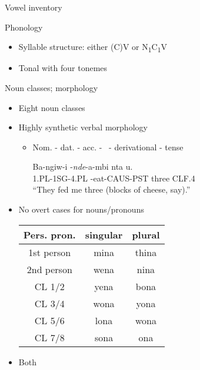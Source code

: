 \documentclass{beamer}
\let\ipa\textipa
\newcommand{\exsc}[1]{{\footnotesize\MakeUppercase{#1}}}
\begin{document}
\begin{frame}{Vowel inventory}
\begin{vowel}
\putcvowel{\ipa{E}\ \textlangle e\textrangle }{3}
\putcvowel{\ipa{O}\ \textlangle o\textrangle }{6}
\putcvowel{\ipa{7}}{7}
\end{vowel}
\end{frame}

\begin{frame}{Phonology}
\begin{itemize}
\item Syllable structure: either (C)V or N\textsubscript{1}C\textsubscript{1}V
\pause
\item Tonal with four tonemes
\end{itemize}
\end{frame}


\begin{frame}{Noun classes; morphology}
  \begin{itemize}
  \item Eight noun classes
  \pause
  \item Highly synthetic verbal morphology
  \begin{itemize}
  \item {Nom. - dat. - acc. - \textsurd\ - derivational - tense
    \begin{exe}
    \sn
    \gll Ba-ngiw-i -\textit{nde}-\textbeltl a-mbi nta u. \\
    \exsc{1.pl}-\exsc{1sg}-\exsc{4.pl} -eat-\exsc{caus}-\exsc{pst} three \exsc{clf.4} \\
    \trans ``They fed me three (blocks of cheese, say).''
    \end{exe}
  }
  \end{itemize}
  \item No overt cases for nouns/pronouns \\
  \begin{center}
\begin{tabular}{c|c|c}
\hline
Pers. pron. & singular & plural \\
\hline
\hline
1st person & mina & thina \\
\hline
2nd person & wena & nina \\
\hline
CL 1/2 & yena & bona \\
\hline
CL 3/4 & wona & yona \\
\hline
CL 5/6 & lona & wona \\
\hline
CL 7/8 & sona & \ipa{Z}ona \\
\hline
\end{tabular}
\end{center}

  \item Both 
  
  \end{itemize}
\end{frame}
\end{document}
